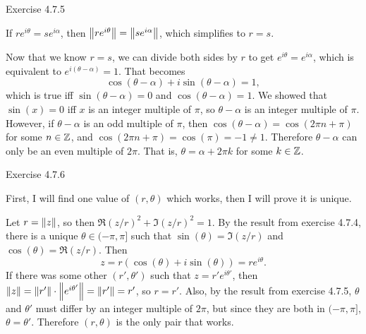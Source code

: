 \documentclass{article}
\begin{document}
\bigskip
\begin{prob}
    Exercise 4.7.5
\end{prob}
If $re^{i \theta}=se^{i \alpha}$, then $\left\lVert re^{i \theta}\right\rVert=\left\lVert se^{i \alpha}\right\rVert$, which simplifies to $r = s$.
\par
Now that we know $r=s$, we can divide both sides by $r$ to get $e^{i \theta}=e^{i \alpha}$, which is equivalent to $e^{i(\theta - \alpha)}=1$. That becomes
\[ \cos(\theta - \alpha) + i \sin(\theta - \alpha) = 1, \]
which is true iff $\sin(\theta - \alpha)=0$ and $\cos(\theta - \alpha)= 1$. We showed that $\sin(x)=0$ iff $x$ is an integer multiple of $\pi$, so $\theta - \alpha$ is an integer multiple of $\pi$. However, if $\theta - \alpha$ is an odd multiple of $\pi$, then $\cos(\theta-\alpha)=\cos(2 \pi n + \pi)$ for some $n \in \mathbb{Z}$, and $\cos(2 \pi n + \pi) = \cos(\pi) = -1 \neq 1$. Therefore $\theta - \alpha$ can only be an even multiple of $2 \pi$. That is, $\theta = \alpha + 2 \pi k $ for some $k \in \mathbb{Z}$.

\bigskip
\begin{prob}
    Exercise 4.7.6
\end{prob}
First, I will find one value of $(r, \theta)$ which works, then I will prove it is unique.
\par
Let $r = \left\lVert z\right\rVert$, so then $\Re(z/r)^2+\Im(z/r)^2=1$. By the result from exercise 4.7.4, there is a unique $\theta \in (-\pi, \pi]$ such that $\sin(\theta)=\Im(z/r)$ and $\cos(\theta)=\Re(z/r)$. Then
\[ z = r \left( \cos(\theta) + i \sin(\theta) \right) = re^{i \theta}. \]
If there was some other $(r', \theta')$ such that $z = r' e^{i \theta'}$, then $\left\lVert z\right\rVert = \left\lVert r'\right\rVert \cdot \left\lVert e^{i \theta'}\right\rVert = \left\lVert r'\right\rVert = r'$, so $r=r'$. Also, by the result from exercise 4.7.5, $\theta$ and $\theta'$ must differ by an integer multiple of $2 \pi$, but since they are both in $(-\pi, \pi]$, $\theta=\theta'$. Therefore $(r, \theta)$ is the only pair that works.


\end{document}
